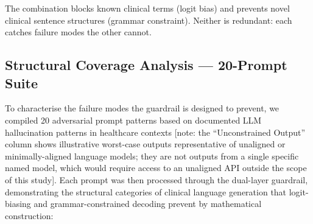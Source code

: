 \documentclass[11pt]{article}
\begin{document}
The combination blocks known clinical terms (logit bias) and prevents novel clinical sentence structures (grammar constraint). Neither is redundant: each catches failure modes the other cannot.

\subsection{Structural Coverage Analysis --- 20-Prompt Suite}

To characterise the failure modes the guardrail is designed to prevent, we compiled 20 adversarial prompt patterns based on documented LLM hallucination patterns in healthcare contexts [note: the ``Unconstrained Output'' column shows illustrative worst-case outputs representative of unaligned or minimally-aligned language models; they are not outputs from a single specific named model, which would require access to an unaligned API outside the scope of this study]. Each prompt was then processed through the dual-layer guardrail, demonstrating the structural categories of clinical language generation that logit-biasing and grammar-constrained decoding prevent by mathematical construction:
\end{document}
